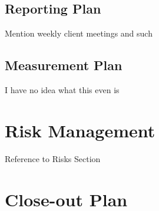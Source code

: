 \subsection{Reporting Plan}

Mention weekly client meetings and such


\subsection{Measurement Plan}

I have no idea what this even is


\section{Risk Management}

	Reference to Risks Section



\section{Close-out Plan}

